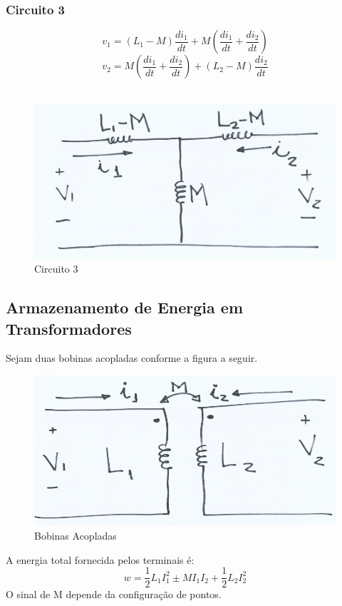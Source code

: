 \documentclass[a4paper, 12pt]{article}
\begin{document}
		\subsubsection{Circuito 3}
			\begin{equation}
				v_1 = (L_1 - M)\frac{di_1}{dt} + M (\frac{di_1}{dt} + \frac{di_2}{dt})
			\end{equation}
			\begin{equation}
				v_2 = M(\frac{di_1}{dt} + \frac{di_2}{dt}) + (L_2 - M) \frac{di_2}{dt}
			\end{equation}\\
			\newpage
			\begin{figure}[h]
				\centering
				\includegraphics[scale=0.4]{a16.png}
				\caption{Circuito 3}
			\end{figure}
			
	\subsection{Armazenamento de Energia em Transformadores}
		Sejam duas bobinas acopladas conforme a figura a seguir.
		\begin{figure}[h]
			\centering
			\includegraphics[scale=0.4]{a17.png}
			\caption{Bobinas Acopladas}
		\end{figure}
		A energia total fornecida pelos terminais é:
		\begin{equation}
			w = \frac{1}{2}L_1I_1^2 \pm MI_1I_2 + \frac{1}{2} L_2I_2^2
		\end{equation}
		O sinal de M depende da configuração de pontos.
		
\end{document}
